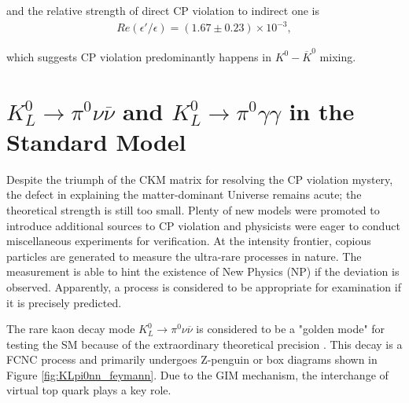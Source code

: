 \noindent
and the relative strength of direct CP violation to indirect one is  
%
\vspace{1em}
\begin{align}
\mathit{Re}(\epsilon'/\epsilon) = (1.67 \pm 0.23) \times 10^{-3},
\end{align}

\noindent
which suggests CP violation predominantly happens in $K^0-\overline{K}^0$ mixing.


\section{$K_L^0 \to \pi^0 \nu \overline{\nu}$ and $K_L^0 \to \pi^0 \gamma \gamma$ in the Standard Model}

% 
%         

Despite the triumph of the CKM matrix for resolving the CP violation mystery, the defect in explaining the matter-dominant Universe remains acute; the theoretical strength is still too small. Plenty of new models were promoted to introduce additional sources to CP violation and physicists were eager to conduct miscellaneous experiments for verification. At the intensity frontier, copious particles are generated to measure the ultra-rare processes in nature. The measurement is able to hint the existence of New Physics (NP) if the deviation is observed. Apparently, a process is considered to be appropriate for examination if it is precisely predicted.


The rare kaon decay mode ${K_L^0 \to \pi^0 \nu \overline{\nu}}$ is considered to be a "golden mode" for testing the SM because of the extraordinary theoretical precision \parencite{KLpi0nn_golden, kaon_SM}. This decay is a FCNC process and primarily undergoes Z-penguin or box diagrams shown in Figure \ref{fig:KLpi0nn_feymann}. Due to the GIM mechanism, the interchange of virtual top quark plays a key role. 

